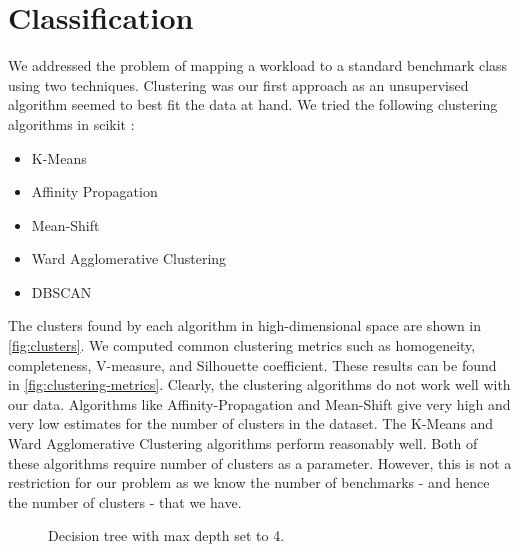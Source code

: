 \section{Classification} \label{sec:classfication}

We addressed the problem of mapping a workload to a standard benchmark class
using two techniques. 
Clustering was our first approach as an unsupervised algorithm seemed to best
fit the data at hand. We tried the following clustering algorithms in scikit :\\

\begin{itemize}
\item K-Means
\item Affinity Propagation
\item Mean-Shift
\item Ward Agglomerative Clustering
\item DBSCAN
\end{itemize}

The clusters found by each algorithm in high-dimensional space are shown in
\cref{fig:clusters}.
We computed common clustering metrics such as homogeneity, completeness,
V-measure, and Silhouette coefficient. These results can be found in
\cref{fig:clustering-metrics}.
Clearly, the clustering algorithms do not work well with our data.
Algorithms like Affinity-Propagation and Mean-Shift give very high and very low
estimates for the number of clusters in the dataset.
The K-Means and Ward Agglomerative Clustering algorithms perform reasonably
well. Both of these algorithms require number of clusters as a parameter. 
However, this is not a restriction for our problem as we know the number of
benchmarks - and hence the number of clusters - that we have.

\begin{figure}[h!]
    \centering
    \caption{Decision tree with max depth set to 4.}
    \label{fig:tree_4}
\end{figure}

